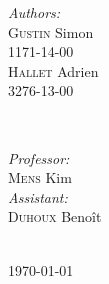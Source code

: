 \begin{titlepage}
        \begin{minipage}{0.4\textwidth}
        \begin{flushleft} \large
        \emph{Authors:}\\
        \textsc{Gustin} Simon \\
        1171-14-00\\
        \textsc{Hallet} Adrien \\
        3276-13-00\\
        \end{flushleft}
        \end{minipage}
        ~
        \begin{minipage}{0.4\textwidth}
        \begin{flushright} \large
        \emph{Professor:} \\
         \textsc{Mens} Kim \\%
         \emph{Assistant:}\\
         \textsc{Duhoux} Benoît
        \end{flushright}
        \end{minipage}\\[1cm]



        {\large \today}\\[2cm] %




        \vfill %
    \end{titlepage}

